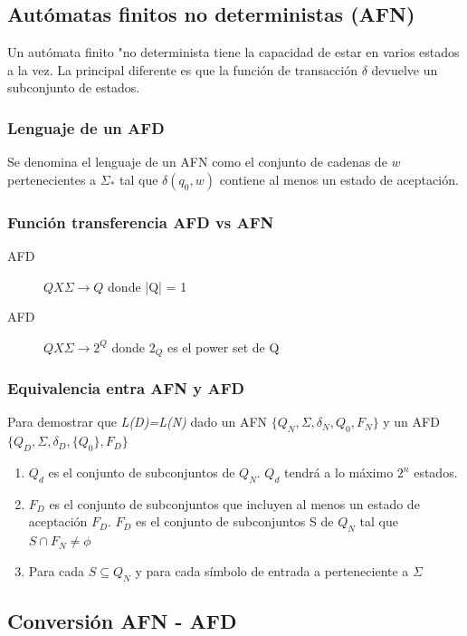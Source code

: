 \documentclass[a4paper,9pt]{extarticle}
\begin{document}
\begin{multicols*}{2}
\subsection{Autómatas finitos no deterministas (AFN)}
Un autómata finito "no  determinista tiene la capacidad de estar en varios estados a la vez. La principal diferente es que la función de transacción $\delta$ devuelve un subconjunto de estados.

\subsubsection{Lenguaje de un AFD}
Se denomina el lenguaje de un AFN como el conjunto de cadenas de $w$ pertenecientes a $\Sigma_*$ tal que $\delta(q_0, w)$ contiene al menos un estado de aceptación.

\subsubsection{Función transferencia AFD vs AFN}
\begin{description}
\item[AFD] $Q X \Sigma \longrightarrow Q$ donde |Q| = 1
\item[AFD] $Q X \Sigma \longrightarrow 2^Q$ donde $2_Q$ es el power set de Q
\end{description}

\subsubsection{Equivalencia entra AFN y AFD}
Para demostrar que \textit{L(D)=L(N)} dado un AFN $\{Q_N, \Sigma, \delta_N, Q_0, F_N \}$ y un AFD $\{Q_D, \Sigma, \delta_D, \{Q_0\}, F_D \}$

\begin{enumerate}
\item $Q_d$ es el conjunto de subconjuntos de $Q_N$. $Q_d$ tendrá a lo máximo $2^n$ estados.
\item $F_D$ es el conjunto de subconjuntos que incluyen al menos un estado de aceptación $F_D$.  $F_D$ es el conjunto de subconjuntos S de $Q_N$ tal que $S \cap F_N \neq \phi $
\item Para cada $S \subseteq Q_N$ y para cada símbolo de entrada a perteneciente a $\Sigma$
\end{enumerate}

\subsection{Conversión AFN - AFD}


\end{multicols*}
\end{document}
